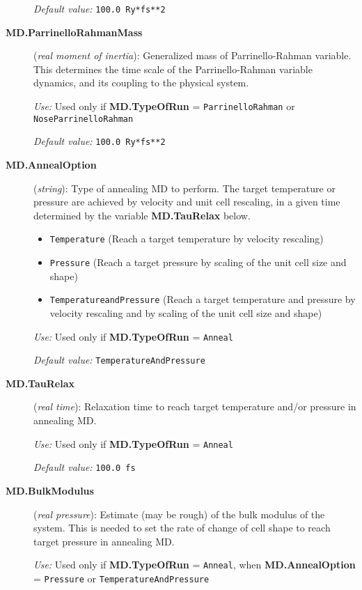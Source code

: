 \begin{description}
{\it Default value:} {\tt 100.0 Ry*fs**2}

\item[{\bf MD.ParrinelloRahmanMass}] ({\it real moment of inertia}): 
Generalized mass of Parrinello-Rahman variable.
This determines the time scale 
of the Parrinello-Rahman variable
dynamics, and its coupling to
the physical system.

{\it Use:} Used only if {\bf MD.TypeOfRun} = {\tt ParrinelloRahman} 
or {\tt NoseParrinelloRahman}

{\it Default value:} {\tt 100.0 Ry*fs**2}

\item[{\bf MD.AnnealOption}] ({\it string}): 
Type of annealing MD to perform. The target temperature or pressure are
achieved by velocity and unit cell rescaling, 
in a given time determined by the variable
{\bf MD.TauRelax} below.
\begin{itemize}
\item {\tt Temperature} (Reach a target temperature by velocity rescaling)
\item {\tt Pressure} (Reach a target pressure by scaling of the unit
cell size and shape)
\item {\tt TemperatureandPressure}  (Reach a target temperature 
and pressure by velocity rescaling and by scaling of the unit
cell size and shape)
\end{itemize}

{\it Use:} Used only if {\bf MD.TypeOfRun} = {\tt Anneal}

{\it Default value:} {\tt TemperatureAndPressure}

\item[{\bf MD.TauRelax}] ({\it real time}): 
Relaxation time to reach target temperature
and/or pressure in annealing MD.

{\it Use:} Used only if {\bf MD.TypeOfRun} = {\tt Anneal}

{\it Default value:} {\tt 100.0 fs}

\item[{\bf MD.BulkModulus}] ({\it real pressure}): 
Estimate (may be rough) of the bulk modulus of the system.
This is needed to set the rate of change of cell shape
to reach target pressure in annealing MD.

{\it Use:} Used only if {\bf MD.TypeOfRun} = {\tt Anneal}, when
{\bf MD.AnnealOption} = {\tt Pressure} or {\tt TemperatureAndPressure}


\end{description}
